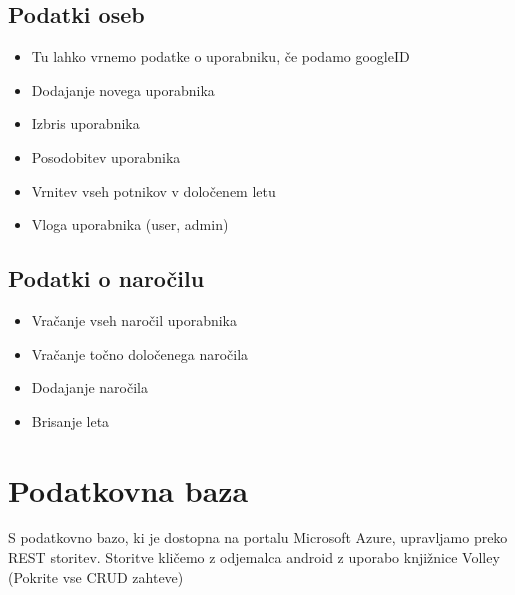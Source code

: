 \documentclass[11pt,a4paper]{article}
\begin{document}
\subsection{Podatki oseb}

	\begin{itemize}
		\item Tu lahko vrnemo podatke o uporabniku, če podamo googleID
		\item Dodajanje novega uporabnika
		\item Izbris uporabnika
		\item Posodobitev uporabnika
		\item Vrnitev vseh potnikov v določenem letu
		\item Vloga uporabnika (user, admin)
	\end{itemize}
\subsection{Podatki o naročilu}

	\begin{itemize}
		\item Vračanje vseh naročil uporabnika
		\item Vračanje točno določenega naročila
		\item Dodajanje naročila
		\item Brisanje leta
	\end{itemize}

\section{Podatkovna baza}
S podatkovno bazo, ki je dostopna na portalu Microsoft Azure, upravljamo preko REST storitev.
Storitve kličemo z odjemalca android z uporabo knjižnice Volley (Pokrite vse CRUD zahteve)
\end{document}
